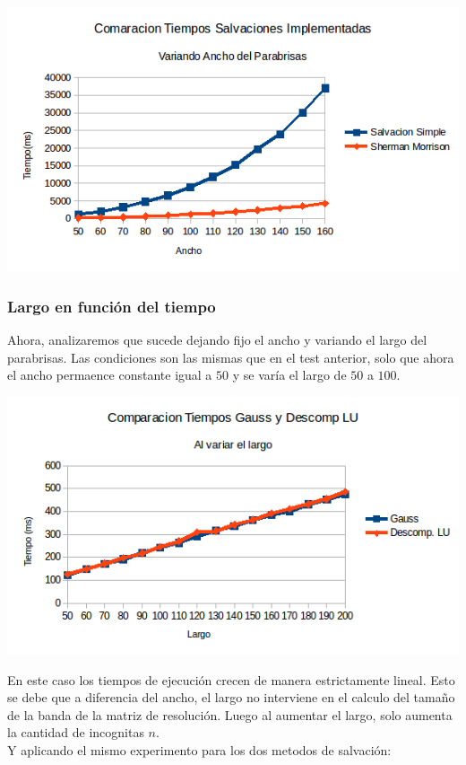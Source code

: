 \begin{center}
 \includegraphics[width=400pt]{imagenes/testeo/anchoSalv.png}
\end{center}

\explicar
\subsubsection{Largo en función del tiempo}
Ahora, analizaremos que sucede dejando fijo el ancho y variando el largo del parabrisas. Las condiciones son las mismas que en el test anterior, solo que ahora el ancho permaence constante igual a $50$ y se varía el largo de $50$ a $100$.

\begin{center}
 \includegraphics[width=400pt]{imagenes/testeo/largoGauss.png}
\end{center}

En este caso los tiempos de ejecución crecen de manera estrictamente lineal. Esto se debe que a diferencia del ancho, el largo no interviene en el calculo del tamaño de la banda de la matriz de resolución. Luego al aumentar el largo, solo aumenta la cantidad de incognitas $n$.
\\
Y aplicando el mismo experimento para los dos metodos de salvación:

